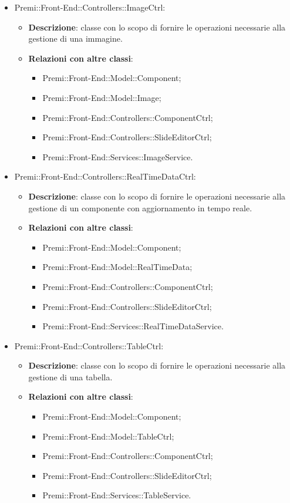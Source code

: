 \begin{itemize}
	\item  Premi::Front-End::Controllers::ImageCtrl:
			\begin{itemize}
				\item \textbf{Descrizione}: classe con lo scopo di fornire le operazioni necessarie alla gestione di una immagine.
				\item \textbf{Relazioni con altre classi}:
					\begin{itemize}
						\item Premi::Front-End::Model::Component;
						\item Premi::Front-End::Model::Image;
						\item Premi::Front-End::Controllers::ComponentCtrl;
						\item Premi::Front-End::Controllers::SlideEditorCtrl;
						\item Premi::Front-End::Services::ImageService.
					\end{itemize}
			\end{itemize}
			
	\item  Premi::Front-End::Controllers::RealTimeDataCtrl:
			\begin{itemize}
				\item \textbf{Descrizione}: classe con lo scopo di fornire le operazioni necessarie alla gestione di un componente con aggiornamento in tempo reale.
				\item \textbf{Relazioni con altre classi}:
					\begin{itemize}
						\item Premi::Front-End::Model::Component;
						\item Premi::Front-End::Model::RealTimeData;
						\item Premi::Front-End::Controllers::ComponentCtrl;
						\item Premi::Front-End::Controllers::SlideEditorCtrl;
						\item Premi::Front-End::Services::RealTimeDataService.
					\end{itemize}
			\end{itemize}
			
	\item  Premi::Front-End::Controllers::TableCtrl:
			\begin{itemize}
				\item \textbf{Descrizione}: classe con lo scopo di fornire le operazioni necessarie alla gestione di una tabella.
				\item \textbf{Relazioni con altre classi}:
					\begin{itemize}
						\item Premi::Front-End::Model::Component;
						\item Premi::Front-End::Model::TableCtrl;
						\item Premi::Front-End::Controllers::ComponentCtrl;
						\item Premi::Front-End::Controllers::SlideEditorCtrl;
						\item Premi::Front-End::Services::TableService.
					\end{itemize}
			\end{itemize}
			

\end{itemize}
